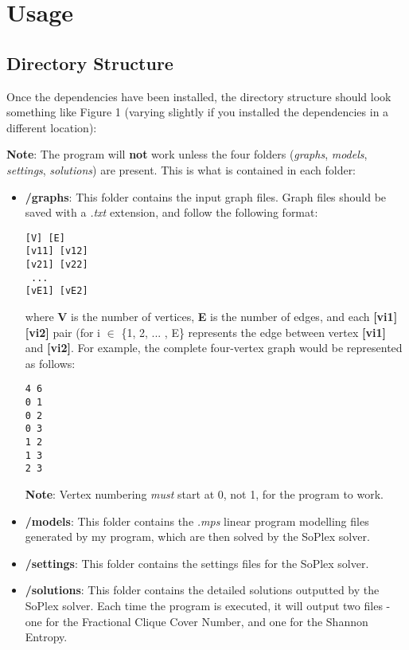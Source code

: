 \documentclass[a4paper]{article}
\begin{document}
\section{Usage}
\subsection{Directory Structure}
Once the dependencies have been installed, the directory structure should look something like Figure 1 (varying slightly if you installed the dependencies in a different location):

\textbf{Note}: The program will \textbf{not} work unless the four folders (\textit{graphs}, \textit{models}, \textit{settings}, \textit{solutions}) are present. This is what is contained in each folder:
\begin{itemize}
\item \textbf{/graphs}: This folder contains the input graph files. Graph files should be saved with a \textit{.txt} extension, and follow the following format:
\begin{center}
\centering
\begin{BVerbatim}
[V] [E]
[v11] [v12]
[v21] [v22]
 ...
[vE1] [vE2]
\end{BVerbatim}
\end{center}  
where \textbf{V} is the number of vertices, \textbf{E} is the number of edges, and each \textbf{[vi1] [vi2]} pair (for i $\in$ \{1, 2, ... , E\} represents the edge between vertex \textbf{[vi1]} and \textbf{[vi2]}. For example, the complete four-vertex graph would be represented as follows:
\begin{center}
\centering
\begin{BVerbatim}
4 6
0 1
0 2
0 3
1 2
1 3
2 3
\end{BVerbatim}
\end{center} 
\textbf{Note}: Vertex numbering \textit{must} start at 0, not 1, for the program to work. 
\item \textbf{/models}: This folder contains the \textit{.mps} linear program modelling files generated by my program, which are then solved by the SoPlex solver. 
\item \textbf{/settings}: This folder contains the settings files for the SoPlex solver.
\item \textbf{/solutions}: This folder contains the detailed solutions outputted by the SoPlex solver. Each time the program is executed, it will output two files - one for the Fractional Clique Cover Number, and one for the Shannon Entropy. 
\end{itemize}
\end{document}
